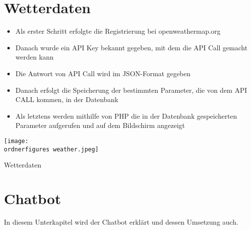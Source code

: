 \section{Wetterdaten}
\begin{itemize}
	\item Als erster Schritt erfolgte die Registrierung bei openweathermap.org 
\end{itemize}
\begin{itemize}
	\item 	Danach wurde ein API Key bekannt gegeben, mit dem die API Call gemacht werden kann
\end{itemize}
\begin{itemize}
	\item Die Antwort von API Call wird im JSON-Format gegeben
\end{itemize}
\begin{itemize}
	\item Danach erfolgt die Speicherung der bestimmten Parameter, die von dem API CALL kommen, in der Datenbank
\end{itemize}
\begin{itemize}
	\item Als letztens werden mithilfe von PHP die in der Datenbank gespeicherten Parameter aufgerufen und auf dem Bildschirm angezeigt
\end{itemize}	
\captionsetup{type=figure}
\texttt{[image: \\ordnerfigures weather.jpeg]}
\caption{Wetterdaten}
\label{Wetter} 
\captionsetup{type=figure} 
\section{Chatbot}
In diesem Unterkapitel wird der Chatbot erklärt und dessen Umsetzung auch.
